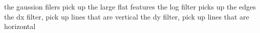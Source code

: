 the gaussion filers pick up the large flat features
the log filter picks up the edges
the dx filter, pick up lines that are vertical
the dy filter, pick up lines that are horizontal